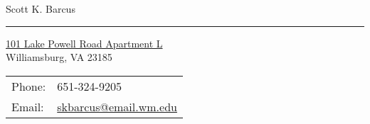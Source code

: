 \documentclass[letterpaper,10pt]{article}
\def\name{Scott K. Barcus}
\begin{document}
\renewcommand{\baselinestretch}{0.0}{
{\huge \name}


\vspace{0.25in}
\hrule height 0.8pt \relax 
\vspace{3mm}
\begin{minipage}{0.45\linewidth}
  \href{http://www.wm.edu/}{101 Lake Powell Road Apartment L} \\
  Williamsburg, VA 23185 \\
\end{minipage}
\begin{minipage}{0.45\linewidth}
  \begin{tabular}{ll}
    Phone: & 651-324-9205 \\
    Email: & \href{mailto:me@email.wm.edu}{skbarcus@email.wm.edu} \\ %
  \end{tabular}
\end{minipage}


}
\end{document}
